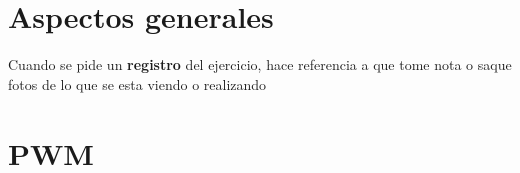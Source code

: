 \documentclass[10pt,conference,a4paper,onecolumn]{article}%
\begin{document}
 \section{Aspectos generales}
 
	Cuando se pide un \textbf{registro} del ejercicio, hace referencia a que tome nota o saque fotos de lo que se esta viendo o realizando  
 
 

\section{PWM}
\end{document}
